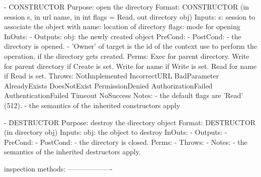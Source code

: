  \begin{myspec}
    - CONSTRUCTOR
      Purpose:  open the directory
      Format:   CONSTRUCTOR        (in  session    s,
                                    in  url        name,
                                    in  int        flags = Read,
                                    out directory  obj)
      Inputs:   s:                  session to associate the
                                    object with
                name:               location of directory
                flags:              mode for opening
      InOuts:   -
      Outputs:  obj:                the newly created object
      PreCond:  -
      PostCond: - the directory is opened.
                - 'Owner' of target is the id of the context
                  use to perform the operation, if the
                  directory gets created.
      Perms:    Exec  for parent directory.
                Write for parent directory if Create is set.
                Write for name if Write is set.
                Read  for name if Read  is set.
      Throws:   NotImplemented
                IncorrectURL
                BadParameter
                AlreadyExists
                DoesNotExist
                PermissionDenied
                AuthorizationFailed
                AuthenticationFailed
                Timeout
                NoSuccess
      Notes:    - the default flags are 'Read' (512).
                - the semantics of the inherited constructors
                  apply
 
 
    - DESTRUCTOR
      Purpose:  destroy the directory object
      Format:   DESTRUCTOR         (in  directory obj)
      Inputs:   obj:                the object to destroy
      InOuts:   -
      Outputs:  -
      PreCond:  -
      PostCond: - the directory is closed.
      Perms:    - 
      Throws:   - 
      Notes:    - the semantics of the inherited destructors
                  apply.
 
 
    inspection methods:
    -------------------
 

\end{myspec}
